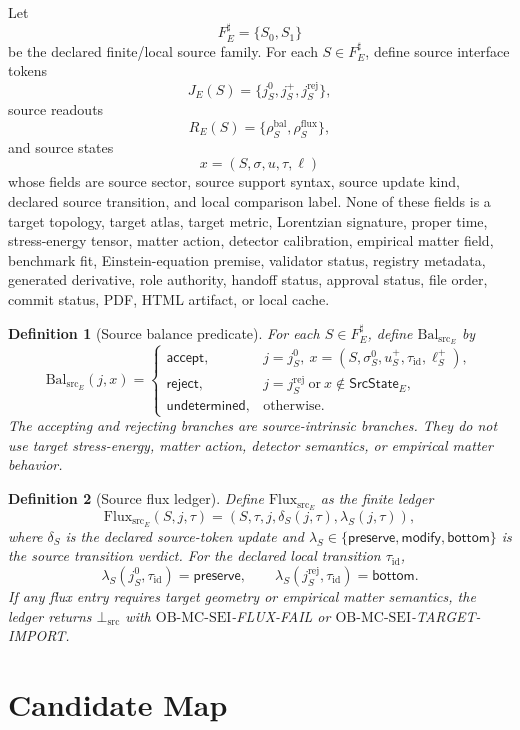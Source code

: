 \documentclass[11pt]{article}
\newcommand{\BalSrc}{\mathrm{Bal}_{\mathrm{src}}}
\newcommand{\FluxSrc}{\mathrm{Flux}_{\mathrm{src}}}
\newcommand{\BottomSrc}{\bot_{\mathrm{src}}}
\newcommand{\OBMCSEI}{\mathrm{OB}\mbox{-}\mathrm{MC}\mbox{-}\mathrm{SEI}}
\newtheorem{definition}{Definition}
\begin{document}
Let
\[
  F_E^\sharp=\{S_0,S_1\}
\]
be the declared finite/local source family. For each
\(S\in F_E^\sharp\), define source interface tokens
\[
  J_E(S)=\{j_S^0,j_S^+,j_S^{\mathrm{rej}}\},
\]
source readouts
\[
  R_E(S)=\{\rho_S^{\mathrm{bal}},\rho_S^{\mathrm{flux}}\},
\]
and source states
\[
  x=(S,\sigma,u,\tau,\ell)
\]
whose fields are source sector, source support syntax, source update kind,
declared source transition, and local comparison label. None of these fields
is a target topology, target atlas, target metric, Lorentzian signature,
proper time, stress-energy tensor, matter action, detector calibration,
empirical matter field, benchmark fit, Einstein-equation premise, validator
status, registry metadata, generated derivative, role authority, handoff
status, approval status, file order, commit status, PDF, HTML artifact, or
local cache.

\begin{definition}[Source balance predicate]
For each \(S\in F_E^\sharp\), define \(\BalSrc_E\) by
\[
  \BalSrc_E(j,x)=
  \begin{cases}
  \mathsf{accept},&
  j=j_S^0,\ x=(S,\sigma_S^0,u_S^+,\tau_{\mathrm{id}},\ell_S^+),\\
  \mathsf{reject},&
  j=j_S^{\mathrm{rej}}\ \text{or}\ x\notin \mathsf{SrcState}_E,\\
  \mathsf{undetermined},&\text{otherwise.}
  \end{cases}
\]
The accepting and rejecting branches are source-intrinsic branches. They do
not use target stress-energy, matter action, detector semantics, or empirical
matter behavior.
\end{definition}

\begin{definition}[Source flux ledger]
Define \(\FluxSrc_E\) as the finite ledger
\[
  \FluxSrc_E(S,j,\tau)=
  (S,\tau,j,\delta_S(j,\tau),\lambda_S(j,\tau)),
\]
where \(\delta_S\) is the declared source-token update and
\(\lambda_S\in\{\mathsf{preserve},\mathsf{modify},\mathsf{bottom}\}\) is the
source transition verdict. For the declared local transition
\(\tau_{\mathrm{id}}\),
\[
  \lambda_S(j_S^0,\tau_{\mathrm{id}})=\mathsf{preserve},
  \qquad
  \lambda_S(j_S^{\mathrm{rej}},\tau_{\mathrm{id}})=\mathsf{bottom}.
\]
If any flux entry requires target geometry or empirical matter semantics, the
ledger returns \(\BottomSrc\) with \(\OBMCSEI\)-FLUX-FAIL or
\(\OBMCSEI\)-TARGET-IMPORT.
\end{definition}

\section{Candidate Map}
\end{document}
